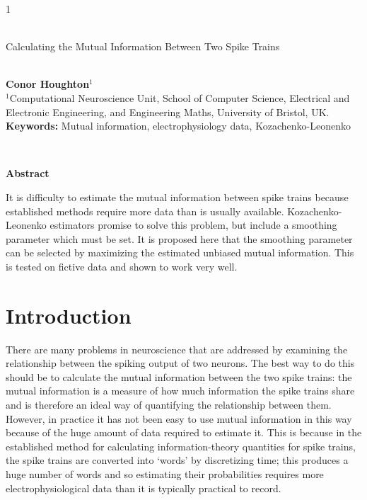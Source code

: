 \documentclass[12pt]{article}
\begin{document}
\hspace{13.9cm}1

\ \vspace{20mm}\\

{\LARGE Calculating the Mutual Information Between Two Spike Trains}

\ \\
{\bf \large Conor Houghton$^{\displaystyle 1}$}\\
{$^{\displaystyle 1}$Computational Neuroscience Unit, School of Computer Science, Electrical and Electronic Engineering, and Engineering Maths, University of Bristol, UK.}\\
%

{\bf Keywords:} Mutual information, electrophysiology data, Kozachenko-Leonenko

\thispagestyle{empty}
%
\ \vspace{-0mm}\\
%
\begin{center} {\bf Abstract} \end{center}
It is difficulty to estimate the mutual information between spike
trains because established methods require more data than is usually
available. Kozachenko-Leonenko estimators promise to solve this
problem, but include a smoothing parameter which must be set. It is
proposed here that the smoothing parameter can be selected by
maximizing the estimated unbiased mutual information. This is tested
on fictive data and shown to work very well.

\section{Introduction}

There are many problems in neuroscience that are addressed by
examining the relationship between the spiking output of two
neurons. The best way to do this should be to calculate the mutual
information between the two spike trains: the mutual information is a
measure of how much information the spike trains share and is
therefore an ideal way of quantifying the relationship between
them. However, in practice it has not been easy to use mutual
information in this way because of the huge amount of data required to
estimate it. This is because in the established method for calculating
information-theory quantities for spike trains, the spike trains are
converted into \lq{}words\rq{} by discretizing time; this produces a
huge number of words and so estimating their probabilities requires
more electrophysiological data than it is typically practical to
record.
\end{document}
